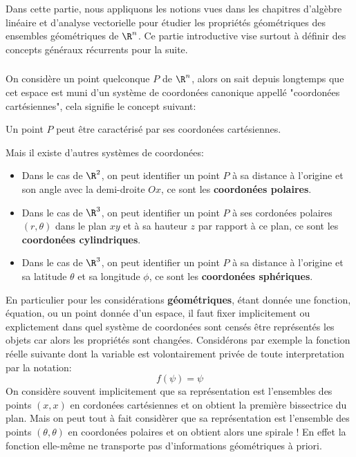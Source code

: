 \chapter*{} %
Dans cette partie, nous appliquons les notions vues dans les chapitres d'algèbre linéaire et d'analyse vectorielle pour étudier les propriétés géométriques des ensembles géométriques de \(\R^n\). Ce partie introductive vise surtout à définir des concepts généraux récurrents pour la suite.

\subsection*{}
On considère un point quelconque \(P\) de \(\R^n\), alors on sait depuis longtemps que cet espace est muni d'un système de coordonées canonique appellé "coordonées cartésiennes", cela signifie le concept suivant:
\begin{center}
   Un point \(P\) peut être caractérisé par ses coordonées cartésiennes.
\end{center}
Mais il existe d'autres systèmes de coordonées:
\begin{itemize}
   \item Dans le cas de \(\R^2\), on peut identifier un point \(P\) à sa distance à l'origine et son angle avec la demi-droite \(Ox\), ce sont les \textbf{coordonées polaires}.
   \item Dans le cas de \(\R^3\), on peut identifier un point \(P\) à ses cordonées polaires \((r, \theta)\) dans le plan \(xy\) et à sa hauteur \(z\) par rapport à ce plan, ce sont les \textbf{coordonées cylindriques}.  
   \item Dans le cas de \(\R^3\), on peut identifier un point \(P\) à sa distance à l'origine et sa latitude \(\theta\) et sa longitude \(\phi\), ce sont les \textbf{coordonées sphériques}.  
\end{itemize}
En particulier pour les considérations \textbf{géométriques}, étant donnée une fonction, équation, ou un point donnée d'un espace, il faut fixer implicitement ou explictement dans quel système de coordonées sont censés être représentés les objets car alors les propriétés sont changées. Considérons par exemple la fonction réelle suivante dont la variable est volontairement privée de toute interpretation par la notation:
\[
   f(\psi) = \psi
\]
On considère souvent implicitement que sa représentation est l'ensembles des points \((x, x)\) en cordonées cartésiennes et on obtient la première bissectrice du plan. Mais on peut tout à fait considèrer que sa représentation est l'ensemble des points \((\theta, \theta)\) en coordonées polaires et on obtient alors une spirale ! En effet la fonction elle-même ne transporte pas d'informations géométriques à priori.\<

